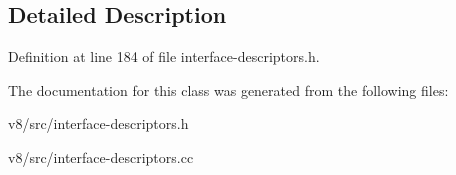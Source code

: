 \subsection{Detailed Description}


Definition at line 184 of file interface-\/descriptors.\+h.



The documentation for this class was generated from the following files\+:\begin{DoxyCompactItemize}
\item 
v8/src/interface-\/descriptors.\+h\item 
v8/src/interface-\/descriptors.\+cc\end{DoxyCompactItemize}
